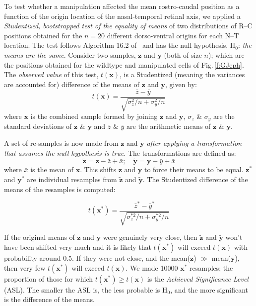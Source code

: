 \documentclass[9pt,lineno]{elife}
\begin{document}
To test whether a manipulation affected the mean rostro-caudal position as a function of the origin location of the nasal-temporal retinal axis, we applied a \emph{Studentized, bootstrapped test of the equality of means} of two distributions of R--C positions obtained for the $n=20$ different dorso-ventral origins for each N--T location. 
The test follows Algorithm 16.2 of~\cite{efron_introduction_1993} and has the null hypothesis, H$_0$: \emph{the means are the same}.
Consider two samples, $\textbf{z}$ and $\textbf{y}$ (both of size $n$); which are the positions obtained for the wildtype and manipulated cells of Fig.\,\ref{f:GJeph}.
The \emph{observed value} of this test, $t(\textbf{x})$, is a Studentized (meaning the variances are accounted for) difference of the means of $\textbf{z}$ and $\textbf{y}$, given by:
%
$$t(\textbf{x}) =  \frac{\bar{z} - \bar{y}}{\sqrt{\sigma_{z}^2/n + \sigma_{y}^2/n} } $$
%
where $\textbf{x}$ is the combined sample formed by joining $\textbf{z}$ and $\textbf{y}$, $\sigma_z$ \& $\sigma_y$ are the standard deviations of $\textbf{z}$ \& $\textbf{y}$ and $\bar{z}$ \& $\bar{y}$ are the arithmetic means of $\textbf{z}$ \& $\textbf{y}$.

A set of re-samples is now made from $\textbf{z}$ and $\textbf{y}$ \emph{after applying a transformation that assumes the null hypothesis is true}.
The transformations are defined as:
%
$$ \tilde{\textbf{z}} = \textbf{z} - \bar{z} + \bar{x}; \quad \tilde{\textbf{y}} = \textbf{y} - \bar{y} + \bar{x} $$
%
where $\bar{x}$ is the mean of $\textbf{x}$. This shifts $\textbf{z}$ and $\textbf{y}$ to force their means to be equal.
$\textbf{z}^*$ and $\textbf{y}^*$ are individual resamples from $\tilde{\textbf{z}}$ and $\tilde{\textbf{y}}$. 
The Studentized difference of the means of the resamples is computed:

$$t(\textbf{x}^*) =  \frac{\bar{z}^* - \bar{y}^*}{\sqrt{\sigma_{z}^{*2}/n + \sigma_{y}^{*2}/n} } $$

If the original means of $\textbf{z}$ and $\textbf{y}$ were genuinely very close, then $\tilde{\textbf{z}}$ and $\tilde{\textbf{y}}$ won't have been shifted very much and it is likely that $t(\textbf{x}^*)$ will exceed $t(\textbf{x})$ with probability around 0.5.
If they were not close, and the mean($\textbf{z}$) $\gg$ mean($\textbf{y}$), then very few $t(\textbf{x}^*)$ will exceed $t(\textbf{x})$. 
We made 10000 $\textbf{x}^*$ resamples; the proportion of those for which $t(\textbf{x}^*) \geq t(\textbf{x})$ is the \emph{Achieved Significance Level} (ASL). 
The smaller the ASL is, the less probable is H$_0$, and the more significant is the difference of the means.
\end{document}
